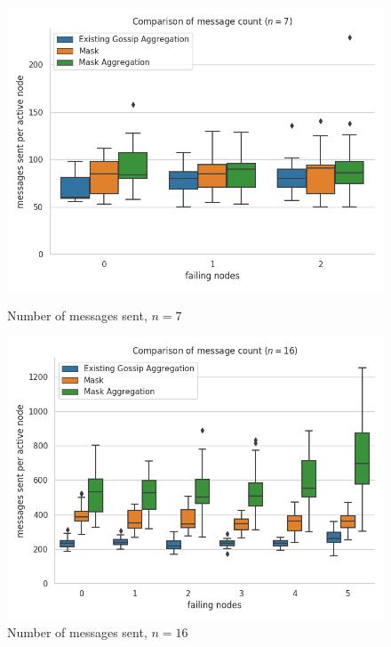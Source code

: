 \begin{figure}[H]
    \centering
    \begin{minipage}{0.5\textwidth}
        \centering
        \includegraphics[width=\textwidth]{images/aggregation_bandwidth_msg_tx_sum_7.png}
        \captionsetup{labelformat=empty}
        \caption{Number of messages sent, $n = 7$}
    \end{minipage}\hfill
    \begin{minipage}{0.5\textwidth}
        \centering
        \includegraphics[width=\textwidth]{images/aggregation_bandwidth_msg_tx_sum_16.png}
        \captionsetup{labelformat=empty}
        \caption{Number of messages sent, $n = 16$}
    \end{minipage}\hfill
\end{figure}

